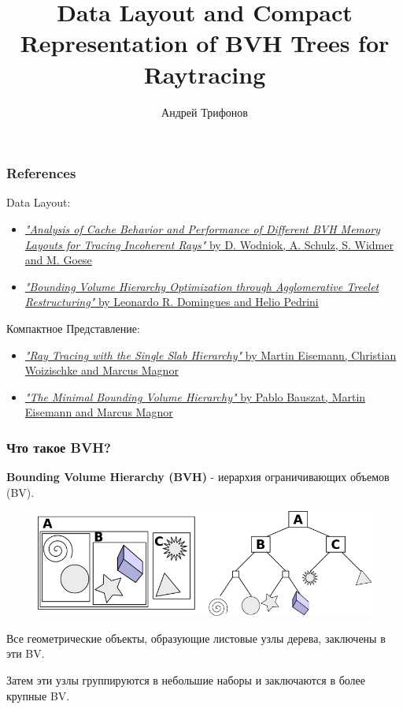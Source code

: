 \documentclass{beamer}
\title{Data Layout and Compact Representation of BVH Trees for Raytracing}
\author{Андрей Трифонов}
\begin{document}
\maketitle

\begin{frame}
    \frametitle{References}
    Data Layout:
    \begin{itemize}
        \item
            \href{https://diglib.eg.org/bitstream/handle/10.2312/EGPGV.EGPGV13.057-064/057-064.pdf?sequence=1}
            {\textit{"Analysis of Cache Behavior and Performance of Different BVH Memory
            Layouts for Tracing Incoherent Rays"} by D. Wodniok, A. Schulz, S. Widmer and M. Goese}
        \item
            \href{https://sci-hub.ru/http://dx.doi.org/10.1145/2790060.2790065}
            {\textit{"Bounding Volume Hierarchy Optimization through Agglomerative Treelet Restructuring"}
            by Leonardo R. Domingues and Helio Pedrini}
    \end{itemize}
    Компактное Представление:
    \begin{itemize}
        \item
            \href{https://woizischke.com/ray-tracing-single-slab-hierarchy.pdf}
            {\textit{"Ray Tracing with the Single Slab Hierarchy"}
            by Martin Eisemann, Christian Woizischke and Marcus Magnor}
        \item
            \href{https://diglib.eg.org/bitstream/handle/10.2312/PE.VMV.VMV10.227-234/227-234.pdf}
            {\textit{"The Minimal Bounding Volume Hierarchy"}
            by Pablo Bauszat, Martin Eisemann and Marcus Magnor}
    \end{itemize}
\end{frame}

\begin{frame}
    \frametitle{Что такое BVH?}
    \begin{block}{}
        \textbf{Bounding Volume Hierarchy (BVH)} - иерархия ограничивающих объемов (BV).
    \end{block}
    \begin{figure}
        \includegraphics[keepaspectratio, width=\textwidth]{res/bvh.png}
    \end{figure}
    Все геометрические объекты, образующие листовые узлы дерева, заключены в эти BV.

    Затем эти узлы группируются в небольшие наборы и заключаются в более крупные BV.

\end{frame}
\end{document}
